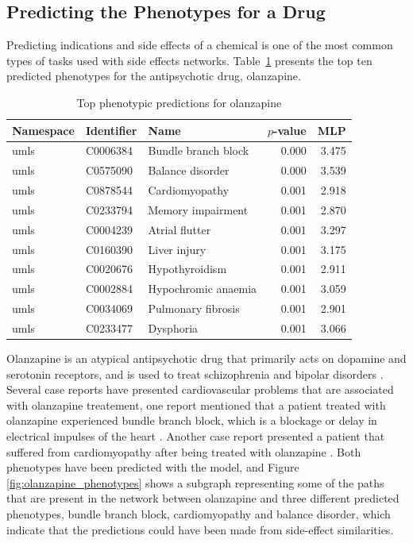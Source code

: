 \subsection{Predicting the Phenotypes for a Drug}

Predicting indications and side effects of a chemical is one of the most common types of tasks used with side effects networks.
Table~\ref{tab:drug_phenotype} presents the top ten predicted phenotypes for the antipsychotic drug, olanzapine.

\begin{table}[!ht]
    \centering
    \begin{tabular}{|l|l|l|r|r|}
        \hline
        \textbf{Namespace} & \textbf{Identifier} & \textbf{Name} & \textbf{$p$-value} & \textbf{MLP} \\
        \hline
        umls & C0006384 & Bundle branch block & 0.000 & 3.475 \\
        \hline
        umls & C0575090 & Balance disorder & 0.000 & 3.539 \\
        \hline
        umls & C0878544 & Cardiomyopathy & 0.001 & 2.918 \\
        \hline
        umls & C0233794 & Memory impairment & 0.001 & 2.870 \\
        \hline
        umls & C0004239 & Atrial flutter & 0.001 & 3.297 \\
        \hline
        umls & C0160390 & Liver injury & 0.001 & 3.175 \\
        \hline
        umls & C0020676 & Hypothyroidism & 0.001 & 2.911 \\
        \hline
        umls & C0002884 & Hypochromic anaemia & 0.001 & 3.059 \\
        \hline
        umls & C0034069 & Pulmonary fibrosis & 0.001 & 2.901 \\
        \hline
        umls & C0233477 & Dysphoria & 0.001 & 3.066 \\
        \hline
    \end{tabular}
    \caption{Top phenotypic predictions for olanzapine}
    \label{tab:drug_phenotype}
\end{table}

Olanzapine is an atypical antipsychotic drug that primarily acts on dopamine and serotonin receptors, and is used to treat schizophrenia and bipolar disorders \cite{thomas_olanzapine_2019}.
Several case reports have presented cardiovascular problems that are associated with olanzapine treatement, one report mentioned that a patient treated with olanzapine experienced bundle branch block, which is a blockage or delay in electrical impulses of the heart \cite{ninan_case_2017}.
Another case report presented a patient that suffered from cardiomyopathy after being treated with olanzapine \cite{puttegowda_olanzapine_2016}.
Both phenotypes have been predicted with the model, and Figure \ref{fig:olanzapine_phenotypes} shows a subgraph representing some of the paths that are present in the network between olanzapine and three different predicted phenotypes, bundle branch block, cardiomyopathy and balance disorder, which indicate that the predictions could have been made from side-effect similarities.

